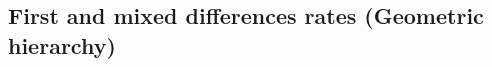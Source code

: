 \documentclass[11pt]{article}
\begin{document}
%
%
%



\subsection{First and mixed differences rates (Geometric hierarchy)}\label{sec:First and mixed differences rates}
\end{document}
